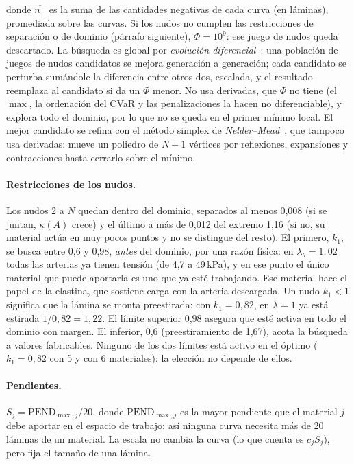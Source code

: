donde $\overline{n^{-}}$ es la suma de las cantidades negativas de cada curva (en láminas), promediada sobre las curvas. Si los nudos no cumplen las restricciones de separación o de dominio (párrafo siguiente), $\Phi=10^{9}$: ese juego de nudos queda descartado.
La búsqueda es global por \emph{evolución diferencial}~\cite{storn}: una población de juegos de nudos candidatos se mejora generación a generación; cada candidato se perturba sumándole la diferencia entre otros dos, escalada, y el resultado reemplaza al candidato si da un $\Phi$ menor. No usa derivadas, que $\Phi$ no tiene (el $\max$, la ordenación del CVaR y las penalizaciones la hacen no diferenciable), y explora todo el dominio, por lo que no se queda en el primer mínimo local. El mejor candidato se refina con el método simplex de \emph{Nelder--Mead}~\cite{nelder}, que tampoco usa derivadas: mueve un poliedro de $N+1$ vértices por reflexiones, expansiones y contracciones hasta cerrarlo sobre el mínimo.

\paragraph{Restricciones de los nudos.} Los nudos 2 a $N$ quedan dentro del dominio, separados al menos 0,008 (si se juntan, $\kappa(A)$ crece) y el último a más de 0,012 del extremo 1,16 (si no, su material actúa en muy pocos puntos y no se distingue del resto). El primero, $k_1$, se busca entre 0,6 y 0,98, \emph{antes} del dominio, por una razón física: en $\lambda_\theta=1{,}02$ todas las arterias ya tienen tensión (de 4,7 a 49\,kPa), y en ese punto el único material que puede aportarla es uno que ya esté trabajando. Ese material hace el papel de la elastina, que sostiene carga con la arteria descargada. Un nudo $k_1<1$ significa que la lámina se monta preestirada: con $k_1=0{,}82$, en $\lambda=1$ ya está estirada $1/0{,}82=1{,}22$. El límite superior 0,98 asegura que esté activa en todo el dominio con margen. El inferior, 0,6 (preestiramiento de 1,67), acota la búsqueda a valores fabricables. Ninguno de los dos límites está activo en el óptimo ($k_1=0{,}82$ con 5 y con 6 materiales): la elección no depende de ellos.

\paragraph{Pendientes.} $S_j=\mathrm{PEND}_{\max,j}/20$, donde $\mathrm{PEND}_{\max,j}$ es la mayor pendiente que el material $j$ debe aportar en el espacio de trabajo: así ninguna curva necesita más de 20 láminas de un material. La escala no cambia la curva (lo que cuenta es $c_jS_j$), pero fija el tamaño de una lámina.

